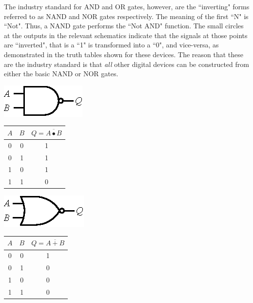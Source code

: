 \documentclass[12pt,oneside,openany,letterpaper]{article}
\begin{document}
\noindent The industry standard for AND and OR gates, however, are the ``inverting" forms referred
to as NAND and NOR gates respectively. The meaning of the first ``N" is ``Not". Thus,
a NAND gate performs the ``Not AND" function. The small circles at the outputs in the relevant
schematics indicate that the signals at those points are ``inverted", that is a ``1" is
transformed into a ``0", and vice-versa, as demonstrated in the truth tables shown for these
devices. The reason that these are the industry standard is that \emph{all} other digital devices can
be constructed from either the basic NAND or NOR gates.

\begin{center}
\begin{minipage}[c]{0.3\textwidth}
\includegraphics[width=4 cm]{nand.eps}
\end{minipage}
\begin{minipage}[c]{0.25\textwidth}
\begin{tabular}{cc|c}
$A$ & $B$ & $Q=\overline{A\bullet B}$\\
\hline
 0 & 0 & 1\\
 0 & 1 & 1\\
 1 & 0 & 1\\
 1 & 1 & 0
\end{tabular}
\end{minipage}
\end{center}

\begin{center}
\begin{minipage}[c]{0.3\textwidth}
\includegraphics[width=4 cm]{nor.eps}
\end{minipage}
\begin{minipage}[c]{0.25\textwidth}
\begin{tabular}{cc|c}
$A$ & $B$ & $Q=\overline{A+B}$\\
\hline
 0 & 0 & 1\\
 0 & 1 & 0\\
 1 & 0 & 0\\
 1 & 1 & 0
\end{tabular}
\end{minipage}
\end{center}
\end{document}
